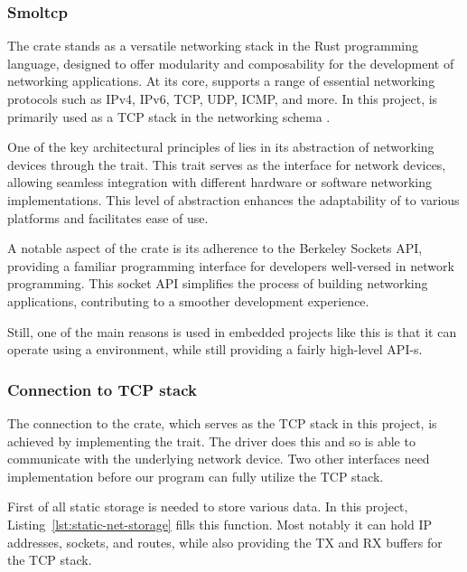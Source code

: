 \subsubsection{Smoltcp}

The  crate stands as a versatile networking stack in the Rust programming language, designed to offer modularity and composability for the development of networking applications. At its core,  supports a range of essential networking protocols such as IPv4, IPv6, TCP, UDP, ICMP, and more. In this project,  is primarily used as a TCP stack in the networking schema \cite{Smoltcp}.

One of the key architectural principles of  lies in its abstraction of networking devices through the  trait. This trait serves as the interface for network devices, allowing seamless integration with different hardware or software networking implementations. This level of abstraction enhances the adaptability of  to various platforms and facilitates ease of use.

A notable aspect of the crate is its adherence to the Berkeley Sockets API, providing a familiar programming interface for developers well-versed in network programming. This socket API simplifies the process of building networking applications, contributing to a smoother development experience.

Still, one of the main reasons  is used in embedded projects like this is that it can operate using a  environment, while still providing a fairly high-level API-s.

\subsubsection{Connection to TCP stack}

The connection to the  crate, which serves as the TCP stack in this project, is achieved by implementing the  trait. The driver does this and so  is able to communicate with the underlying network device. Two other interfaces need implementation before our program can fully utilize the TCP stack.

First of all static storage is needed to store various data. In this project, Listing~\ref{lst:static-net-storage} fills this function. Most notably it can hold IP addresses, sockets, and routes, while also providing the TX and RX buffers for the TCP stack.

